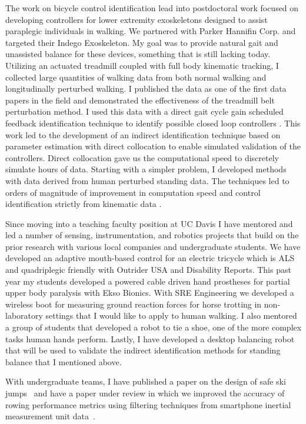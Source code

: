\documentclass{article}
\begin{document}
The work on bicycle control identification lead into postdoctoral work focused
on developing controllers for lower extremity exoskeletons designed to assist
paraplegic individuals in walking. We partnered with Parker Hannifin Corp. and
targeted their Indego Exoskeleton. My goal was to provide natural gait and
unassisted balance for these devices, something that is still lacking today.
Utilizing an actuated treadmill coupled with full body kinematic tracking, I
collected large quantities of walking data from both normal walking and
longitudinally perturbed walking. I published the data as one of the first data
papers in the field \cite{Moore2015b} and demonstrated the effectiveness of the
treadmill belt perturbation method. I used this data with a direct gait cycle
gain scheduled feedback identification technique to identify possible closed
loop controllers \cite{Moore2013c,Moore2014a,Moore2014c}. This work led to the
development of an indirect identification technique based on parameter
estimation with direct collocation to enable simulated validation of the
controllers. Direct collocation gave us the computational speed to discretely
simulate hours of data. Starting with a simpler problem, I developed methods
with data derived from human perturbed standing data. The techniques led to
orders of magnitude of improvement in computation speed and control
identification strictly from kinematic data \cite{Moore2014e,Moore2015}.

Since moving into a teaching faculty position at UC Davis I have mentored and
led a number of sensing, instrumentation, and robotics projects that build on
the prior research with various local companies and undergraduate students. We
have developed an adaptive mouth-based control for an electric tricycle which
is ALS and quadriplegic friendly with Outrider USA and Disability Reports. This
past year my students developed a powered cable driven hand prostheses for
partial upper body paralysis with Ekso Bionics. With SRE Engineering we
developed a wireless boot for measuring ground reaction forces for horse
trotting in non-laboratory settings that I would like to apply to human
walking. I also mentored a group of students that developed a robot to tie a
shoe, one of the more complex tasks human hands perform. Lastly, I have
developed a desktop balancing robot that will be used to validate the indirect
identification methods for standing balance that I mentioned above.

With
undergraduate teams, I have published a paper on the design of safe ski
jumps~\cite{Moore2018} and have a paper under review in which we improved the
accuracy of rowing performance metrics using filtering techniques from
smartphone inertial measurement unit data~\cite{Cloud2019b}.
\end{document}
